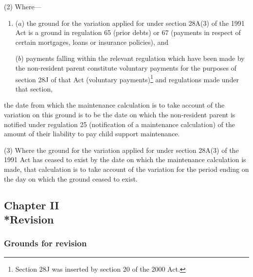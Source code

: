 \documentclass[12pt,a4paper]{article}
\begin{document}
(2) Where—
\begin{enumerate}\item[]
($a$) the ground for the variation applied for under section 28A(3) of the 1991 Act is a ground in regulation 65 (prior debts) or 67 (payments in respect of certain mortgages, loans or insurance policies), and

($b$) payments falling within the relevant regulation which have been made by the non-resident parent constitute voluntary payments for the purposes of section 28J of that Act (voluntary payments)\footnote{Section 28J was inserted by section 20 of the 2000 Act.} and regulations made under that section,
\end{enumerate}
the date from which the maintenance calculation is to take account of the variation on this ground is to be the date on which the non-resident parent is notified under regulation 25 (notification of a maintenance calculation) of the amount of their liability to pay child support maintenance.

(3) Where the ground for the variation applied for under section 28A(3) of the 1991 Act has ceased to exist by the date on which the maintenance calculation is made, that calculation is to take account of the variation for the period ending on the day on which the ground ceased to exist.

\subsection[Chapter II --- Revision]{Chapter II\\*Revision}

\renewcommand\parthead{--- Part III Chapter II}

\subsubsection[14. Grounds for revision]{Grounds for revision}
\end{document}
